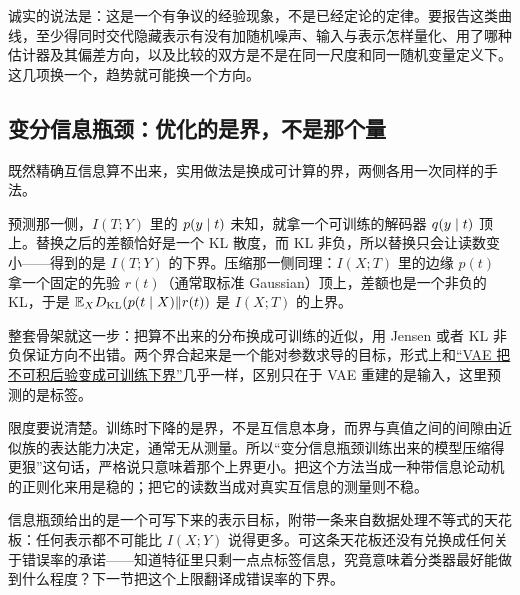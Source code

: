 诚实的说法是：这是一个有争议的经验现象，不是已经定论的定律。要报告这类曲线，至少得同时交代隐藏表示有没有加随机噪声、输入与表示怎样量化、用了哪种估计器及其偏差方向，以及比较的双方是不是在同一尺度和同一随机变量定义下。这几项换一个，趋势就可能换一个方向。

\subsection{变分信息瓶颈：优化的是界，不是那个量}

既然精确互信息算不出来，实用做法是换成可计算的界，两侧各用一次同样的手法。

预测那一侧，\(I(T;Y)\) 里的 \(p(y\mid t)\) 未知，就拿一个可训练的解码器 \(q(y\mid t)\) 顶上。替换之后的差额恰好是一个 KL 散度，而 KL 非负，所以替换只会让读数变小——得到的是 \(I(T;Y)\) 的下界。压缩那一侧同理：\(I(X;T)\) 里的边缘 \(p(t)\) 拿一个固定的先验 \(r(t)\)（通常取标准 Gaussian）顶上，差额也是一个非负的 KL，于是 \(\mathbb{E}_XD_{\mathrm{KL}}(p(t\mid X)\|r(t))\) 是 \(I(X;T)\) 的上界。

整套骨架就这一步：把算不出来的分布换成可训练的近似，用 Jensen 或者 KL 非负保证方向不出错。两个界合起来是一个能对参数求导的目标，形式上和\hyperref[sec:14-Deep-Learning/06-Variational-Autoencoders/01]{``VAE 把不可积后验变成可训练下界''}几乎一样，区别只在于 VAE 重建的是输入，这里预测的是标签。

限度要说清楚。训练时下降的是界，不是互信息本身，而界与真值之间的间隙由近似族的表达能力决定，通常无从测量。所以``变分信息瓶颈训练出来的模型压缩得更狠''这句话，严格说只意味着那个上界更小。把这个方法当成一种带信息论动机的正则化来用是稳的；把它的读数当成对真实互信息的测量则不稳。

信息瓶颈给出的是一个可写下来的表示目标，附带一条来自数据处理不等式的天花板：任何表示都不可能比 \(I(X;Y)\) 说得更多。可这条天花板还没有兑换成任何关于错误率的承诺——知道特征里只剩一点点标签信息，究竟意味着分类器最好能做到什么程度？下一节把这个上限翻译成错误率的下界。
